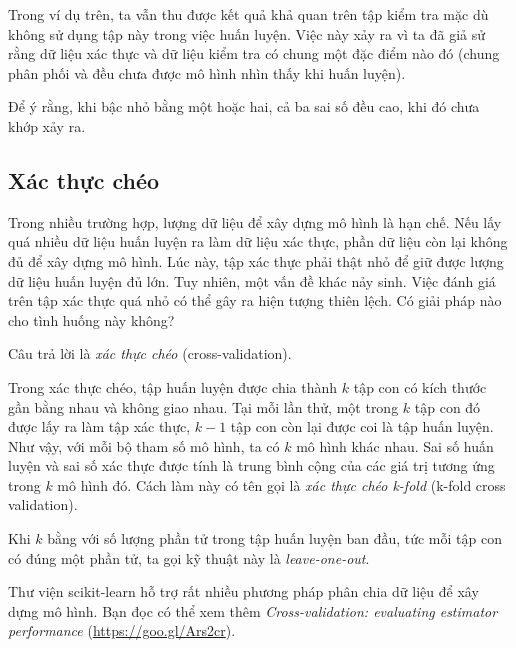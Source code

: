 Trong ví dụ trên, ta vẫn thu được kết quả khả quan trên tập kiểm tra mặc dù không sử dụng tập này trong việc huấn luyện. Việc này xảy ra vì ta đã giả sử rằng dữ liệu xác thực và dữ liệu kiểm tra
có chung một đặc điểm nào đó (chung phân phối và đều chưa được mô hình nhìn thấy
khi huấn luyện).

Để ý rằng, khi bậc nhỏ bằng một hoặc hai, cả ba sai số đều cao, khi đó chưa khớp xảy ra.



\subsection{Xác thực chéo}
\label{ssec:crosvalid}

Trong nhiều trường hợp, lượng dữ liệu để xây dựng mô hình là hạn chế. Nếu lấy
quá nhiều dữ liệu huấn luyện ra làm dữ liệu xác thực, phần dữ liệu còn lại không
đủ để xây dựng mô hình. Lúc này, tập xác thực phải thật nhỏ để giữ được lượng dữ
liệu huấn luyện đủ lớn. Tuy nhiên, một vấn đề khác nảy sinh. Việc đánh giá trên tập xác thực quá nhỏ có thể gây ra hiện tượng thiên lệch. Có giải pháp nào cho tình huống này không?

Câu trả lời là \textit{xác thực chéo} ({cross-validation}).

Trong xác thực chéo, tập huấn luyện được chia thành $k$ tập con có kích thước gần bằng nhau và không giao nhau. Tại mỗi lần thử, một trong $k$ tập con đó được lấy ra làm tập xác thực, $k-1$ tập con còn lại được coi là tập huấn luyện. Như vậy, với mỗi bộ tham số mô hình, ta có $k$ mô hình khác nhau. Sai số huấn luyện và sai số xác thực được tính là trung bình cộng của các giá trị tương ứng trong $k$ mô hình đó. Cách làm này có tên gọi là \textit{xác thực chéo k-fold} (k-fold cross validation).

Khi $k$ bằng với số lượng phần tử trong tập huấn luyện ban đầu, tức mỗi
tập con có đúng một phần tử, ta gọi kỹ thuật này là \textit{leave-one-out}.

Thư viện scikit-learn hỗ trợ rất nhiều phương pháp phân chia dữ liệu để xây dựng mô hình. Bạn đọc có thể xem thêm
\textit{Cross-validation: evaluating estimator performance} (\url{https://goo.gl/Ars2cr}).





